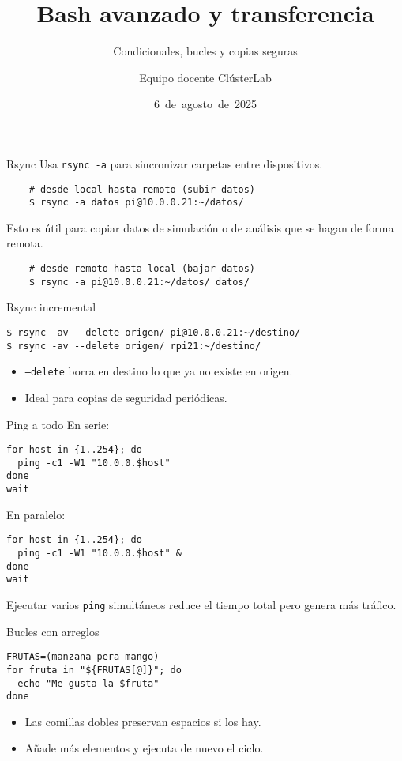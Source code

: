 \documentclass[aspectratio=169,professionalfonts]{beamer}
\title[ClústerLab • Día 2]{Bash avanzado y transferencia}
\subtitle{Condicionales, bucles y copias seguras}
\author{Equipo docente ClústerLab}
\date{6 de agosto de 2025}
\begin{document}
\begin{frame}[plain]
  \titlepage
\end{frame}

\begin{frame}[fragile]{Rsync}
  Usa \texttt{rsync -a} para sincronizar carpetas entre dispositivos.
  \begin{verbatim}
    # desde local hasta remoto (subir datos)
    $ rsync -a datos pi@10.0.0.21:~/datos/
  \end{verbatim}
  Esto es útil para copiar datos de simulación o de análisis que se hagan de forma remota.
  \begin{verbatim}
    # desde remoto hasta local (bajar datos)
    $ rsync -a pi@10.0.0.21:~/datos/ datos/
  \end{verbatim}
\end{frame}

\begin{frame}[fragile]{Rsync incremental}
  \begin{verbatim}
$ rsync -av --delete origen/ pi@10.0.0.21:~/destino/
$ rsync -av --delete origen/ rpi21:~/destino/
  \end{verbatim}
  \begin{itemize}
    \item \texttt{--delete} borra en destino lo que ya no existe en origen.
    \item Ideal para copias de seguridad periódicas.
  \end{itemize}
\end{frame}

\begin{frame}[fragile]{Ping a todo}
  En serie: 
  \begin{verbatim}
for host in {1..254}; do
  ping -c1 -W1 "10.0.0.$host"
done
wait
  \end{verbatim}
En paralelo: 
  \begin{verbatim}
for host in {1..254}; do
  ping -c1 -W1 "10.0.0.$host" &
done
wait
  \end{verbatim}
  Ejecutar varios \texttt{ping} simultáneos reduce el tiempo total pero genera más tráfico.
\end{frame}

\begin{frame}[fragile]{Bucles con arreglos}
  \begin{verbatim}
FRUTAS=(manzana pera mango)
for fruta in "${FRUTAS[@]}"; do
  echo "Me gusta la $fruta"
done
  \end{verbatim}
  \begin{itemize}
    \item Las comillas dobles preservan espacios si los hay.
    \item Añade más elementos y ejecuta de nuevo el ciclo.
  \end{itemize}
\end{frame}
\end{document}
